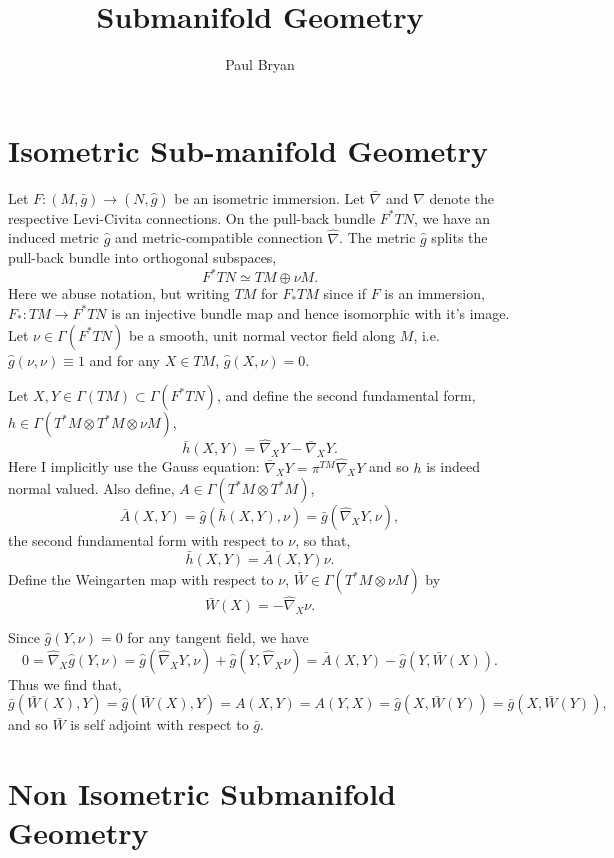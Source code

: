 \documentclass{article}
\title{Submanifold Geometry}
\author{Paul Bryan}
\begin{document}
\maketitle

\section{Isometric Sub-manifold Geometry}

Let $F: (M, \bar{g}) \to (N, \hat{g})$ be an isometric immersion. Let $\bar{\nabla}$ and $\hat{\nabla}$ denote the respective Levi-Civita connections. On the pull-back bundle $F^{\ast} TN$, we have an induced metric $\hat{g}$ and metric-compatible connection $\hat{\nabla}$. The metric $\hat{g}$ splits the  pull-back bundle into orthogonal subspaces,
\[
F^{\ast}TN \simeq TM \oplus \nu M.
\]
Here we abuse notation, but writing $TM$ for $F_{\ast} TM$ since if $F$ is an immersion, $F_{\ast} : TM \to F^{\ast} TN$ is an injective bundle map and hence isomorphic with it's image. Let $\nu \in \Gamma(F^{\ast}TN)$ be a smooth, unit normal vector field along $M$, i.e. $\hat{g}(\nu, \nu) \equiv 1$ and for any $X \in TM$, $\hat{g}(X, \nu) = 0$.

Let $X, Y \in \Gamma(TM) \subset \Gamma(F^{\ast}TN)$, and define the second fundamental form, $h \in \Gamma(T^{\ast} M \otimes T^{\ast} M \otimes \nu M)$,
\[
\bar{h}(X, Y) = \hat{\nabla}_X Y - \bar{\nabla}_X Y.
\]
Here I implicitly use the Gauss equation: $\bar{\nabla}_X Y = \pi^{TM} \hat{\nabla}_X Y$ and so $h$ is indeed normal valued. Also define, $A \in \Gamma(T^{\ast}M \otimes T^{\ast} M)$,
\[
\bar{A}(X, Y) = \hat{g}(\bar{h}(X, Y), \nu) = \bar{g} (\hat{\nabla}_X Y, \nu),
\]
the second fundamental form with respect to $\nu$, so that,
\[
\bar{h}(X, Y) = \bar{A}(X, Y) \nu.
\]
Define the Weingarten map with respect to $\nu$, $\bar{W} \in \Gamma(T^{\ast}M \otimes \nu M)$ by
\[
\bar{W}(X) = - \hat{\nabla}_X \nu.
\]

Since $\hat{g}(Y, \nu) = 0$ for any tangent field, we have
\[
0 = \hat{\nabla}_X \hat{g} (Y, \nu) = \hat{g}(\hat{\nabla}_X Y, \nu) + \hat{g} (Y, \hat{\nabla}_X \nu) = \bar{A}(X, Y) - \hat{g}(Y, \bar{W}(X)).
\]
Thus we find that,
\[
\bar{g} (\bar{W}(X), Y) = \hat{g} (\bar{W}(X), Y) = A(X, Y) = A(Y, X) = \hat{g}(X, \bar{W}(Y)) = \bar{g}(X, \bar{W}(Y)),
\]
and so $\bar{W}$ is self adjoint with respect to $\bar{g}$.

\section{Non Isometric Submanifold Geometry}
\end{document}
